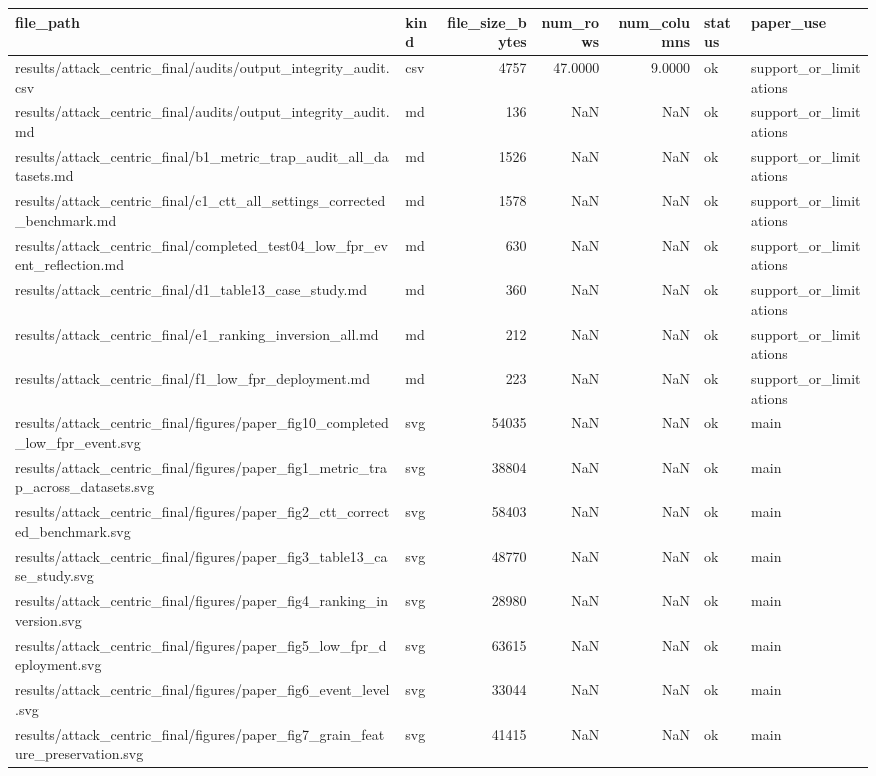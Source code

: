 \begin{tabular}{llrrrll}
\toprule
file_path & kind & file_size_bytes & num_rows & num_columns & status & paper_use \\
\midrule
results/attack_centric_final/audits/output_integrity_audit.csv & csv & 4757 & 47.0000 & 9.0000 & ok & support_or_limitations \\
results/attack_centric_final/audits/output_integrity_audit.md & md & 136 & NaN & NaN & ok & support_or_limitations \\
results/attack_centric_final/b1_metric_trap_audit_all_datasets.md & md & 1526 & NaN & NaN & ok & support_or_limitations \\
results/attack_centric_final/c1_ctt_all_settings_corrected_benchmark.md & md & 1578 & NaN & NaN & ok & support_or_limitations \\
results/attack_centric_final/completed_test04_low_fpr_event_reflection.md & md & 630 & NaN & NaN & ok & support_or_limitations \\
results/attack_centric_final/d1_table13_case_study.md & md & 360 & NaN & NaN & ok & support_or_limitations \\
results/attack_centric_final/e1_ranking_inversion_all.md & md & 212 & NaN & NaN & ok & support_or_limitations \\
results/attack_centric_final/f1_low_fpr_deployment.md & md & 223 & NaN & NaN & ok & support_or_limitations \\
results/attack_centric_final/figures/paper_fig10_completed_low_fpr_event.svg & svg & 54035 & NaN & NaN & ok & main \\
results/attack_centric_final/figures/paper_fig1_metric_trap_across_datasets.svg & svg & 38804 & NaN & NaN & ok & main \\
results/attack_centric_final/figures/paper_fig2_ctt_corrected_benchmark.svg & svg & 58403 & NaN & NaN & ok & main \\
results/attack_centric_final/figures/paper_fig3_table13_case_study.svg & svg & 48770 & NaN & NaN & ok & main \\
results/attack_centric_final/figures/paper_fig4_ranking_inversion.svg & svg & 28980 & NaN & NaN & ok & main \\
results/attack_centric_final/figures/paper_fig5_low_fpr_deployment.svg & svg & 63615 & NaN & NaN & ok & main \\
results/attack_centric_final/figures/paper_fig6_event_level.svg & svg & 33044 & NaN & NaN & ok & main \\
results/attack_centric_final/figures/paper_fig7_grain_feature_preservation.svg & svg & 41415 & NaN & NaN & ok & main \\

\end{tabular}
